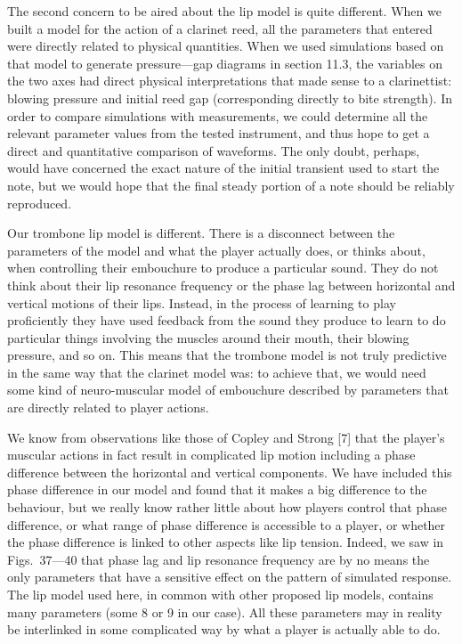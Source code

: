   The second concern to be aired about the lip model is quite different. When 
  we built a model for the action of a clarinet reed, all the parameters that 
  entered were directly related to physical quantities. When we used 
  simulations based on that model to generate pressure—gap diagrams in section 
  11.3, the variables on the two axes had direct physical interpretations that 
  made sense to a clarinettist: blowing pressure and initial reed gap 
  (corresponding directly to bite strength). In order to compare simulations 
  with measurements, we could determine all the relevant parameter values from 
  the tested instrument, and thus hope to get a direct and quantitative 
  comparison of waveforms. The only doubt, perhaps, would have concerned the 
  exact nature of the initial transient used to start the note, but we would 
  hope that the final steady portion of a note should be reliably reproduced. 

  Our trombone lip model is different. There is a disconnect between the 
  parameters of the model and what the player actually does, or thinks about, 
  when controlling their embouchure to produce a particular sound. They do not 
  think about their lip resonance frequency or the phase lag between horizontal 
  and vertical motions of their lips. Instead, in the process of learning to 
  play proficiently they have used feedback from the sound they produce to 
  learn to do particular things involving the muscles around their mouth, their 
  blowing pressure, and so on. This means that the trombone model is not truly 
  predictive in the same way that the clarinet model was: to achieve that, we 
  would need some kind of neuro-muscular model of embouchure described by 
  parameters that are directly related to player actions. 

  We know from observations like those of Copley and Strong [7] that the 
  player’s muscular actions in fact result in complicated lip motion including 
  a phase difference between the horizontal and vertical components. We have 
  included this phase difference in our model and found that it makes a big 
  difference to the behaviour, but we really know rather little about how 
  players control that phase difference, or what range of phase difference is 
  accessible to a player, or whether the phase difference is linked to other 
  aspects like lip tension. Indeed, we saw in Figs.\ 37—40 that phase lag and 
  lip resonance frequency are by no means the only parameters that have a 
  sensitive effect on the pattern of simulated response. The lip model used 
  here, in common with other proposed lip models, contains many parameters 
  (some 8 or 9 in our case). All these parameters may in reality be interlinked 
  in some complicated way by what a player is actually able to do. 

